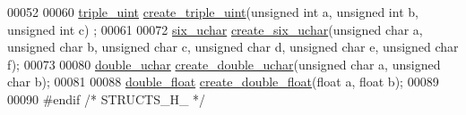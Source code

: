 \begin{DoxyCode}
00052 
00060 \hyperlink{structtriple__uint}{triple\_uint} \hyperlink{structs_8h_a0bd229363859ac7df4e837cba6ad7ae4}{create\_triple\_uint}(\textcolor{keywordtype}{unsigned} \textcolor{keywordtype}{int} a, \textcolor{keywordtype}{unsigned} \textcolor{keywordtype}{int} b, \textcolor{keywordtype}{unsigned} \textcolor{keywordtype}{int} c)
      ;
00061 
00072 \hyperlink{structsix__uchar}{six\_uchar} \hyperlink{structs_8h_a745732bdf1500669605253e94c59c459}{create\_six\_uchar}(\textcolor{keywordtype}{unsigned} \textcolor{keywordtype}{char} a, \textcolor{keywordtype}{unsigned} \textcolor{keywordtype}{char} b, \textcolor{keywordtype}{unsigned} \textcolor{keywordtype}{char} c, \textcolor{keywordtype}{
      unsigned} \textcolor{keywordtype}{char} d, \textcolor{keywordtype}{unsigned} \textcolor{keywordtype}{char} e, \textcolor{keywordtype}{unsigned} \textcolor{keywordtype}{char} f);
00073 
00080 \hyperlink{structdouble__uchar}{double\_uchar} \hyperlink{structs_8h_aecdd3a7cbfc61e4e2c33fc9215422d96}{create\_double\_uchar}(\textcolor{keywordtype}{unsigned} \textcolor{keywordtype}{char} a, \textcolor{keywordtype}{unsigned} \textcolor{keywordtype}{char} b);
00081 
00088 \hyperlink{structdouble__float}{double\_float} \hyperlink{structs_8h_a85207aa5455eaa4d4cf9c71e9094ae46}{create\_double\_float}(\textcolor{keywordtype}{float} a, \textcolor{keywordtype}{float} b);
00089 
00090 \textcolor{preprocessor}{#endif }\textcolor{comment}{/* STRUCTS\_H\_ */}\textcolor{preprocessor}{}
\end{DoxyCode}
